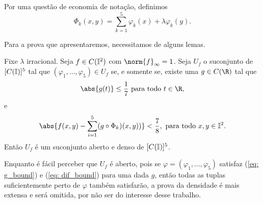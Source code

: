 \begin{rem}
    Por uma questão de economia de notação, definimos \[
        \Phi_{ k }(x, y) = \sum_{ k=1 }^{ 5 } \varphi_{ k } (x) + \lambda \varphi_{ k } (y)
    .\]
\end{rem}
Para a prova que apresentaremos, necessitamos de alguns lemas.
\begin{lem}
    Fixe \( \lambda \) irracional.
    Seja \( f \in C(\mathbb{I}^2) \) com \( \norm{ f }_{ \infty } = 1 \).
    Seja \( U_{ f } \) o suconjunto de \( [C(\mathbb{I})]^{ 5 } \) tal que \( ( \varphi_{ 1 }, \dots, \varphi_{ 5 } ) \in U_{ f } \) se, e somente se, existe uma \( g \in C(\R) \) tal que
    \begin{equation}
        \abs{ g(t) } \leq \frac{ 1 }{ 7 } \text{ para todo } t \in \R
        \label{eq: g_bound}
    ,\end{equation}
    e
    \begin{equation}
        \abs{ 
            f(x, y)
            - \sum_{ i=1 }^{ 5 } (g \circ \Phi_{ k })(x, y) )
         }
         < \frac{ 7 }{ 8 }, \text{ para todo } x, y \in \I^2
         \label{eq: dif_bound}
    .\end{equation}
    Então \( U_{ f } \) é um suconjunto aberto e denso de \( [C(\mathbb{I})]^{ 5 } \).
    \label{lem: uf}
\end{lem}
Enquanto é fácil perceber que \( U_{ f } \) é aberto, pois se \( \varphi = ( \varphi_{ 1 }, \dots, \varphi_{ 5 } ) \) satisfaz (\ref{eq: g_bound}) e (\ref{eq: dif_bound}) para uma dada \( g \), então todas as tuplas suficientemente perto de \( \varphi \) também satisfarão, a prova da densidade é mais extensa e será omitida, por não ser do interesse desse trabalho.

